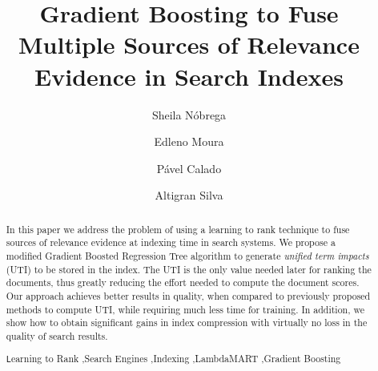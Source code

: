 \documentclass[preprint,review,10pt,3p]{elsarticle}
\begin{document}
\begin{frontmatter}



\title{Gradient Boosting to Fuse Multiple Sources of Relevance Evidence in Search Indexes}

\author[mymainaddress]{Sheila N{\'obrega}}
\author[mymainaddress]{Edleno Moura}
\author[mysecondaryaddress]{P{\'a}vel Calado}
\author[mymainaddress]{Altigran Silva}

\address[mymainaddress]{Universidade Federal do Amazonas, Brasil}
\address[mysecondaryaddress]{INESC-ID, Instituto Superior T{\'e}cnico, Universidade de Lisboa}

\begin{abstract}

In this paper we address the problem of using a learning to rank technique to fuse sources of relevance evidence at indexing time in search systems. We propose a modified Gradient Boosted Regression Tree algorithm to generate \textit{unified term impacts} (UTI) to be stored in the index.
The UTI is the only value needed later for ranking the documents, thus greatly reducing the effort needed to compute the document scores. 
Our approach achieves better results in quality, when compared to previously proposed methods to compute UTI, while requiring much less time for training. In addition, we show how to obtain significant gains in index compression with virtually no loss in the quality of search results.


\begin{keyword}
\texttt Learning to Rank \sep Search Engines \sep Indexing \sep LambdaMART \sep Gradient Boosting
\end{keyword}

\end{abstract}
\end{frontmatter}
\end{document}
